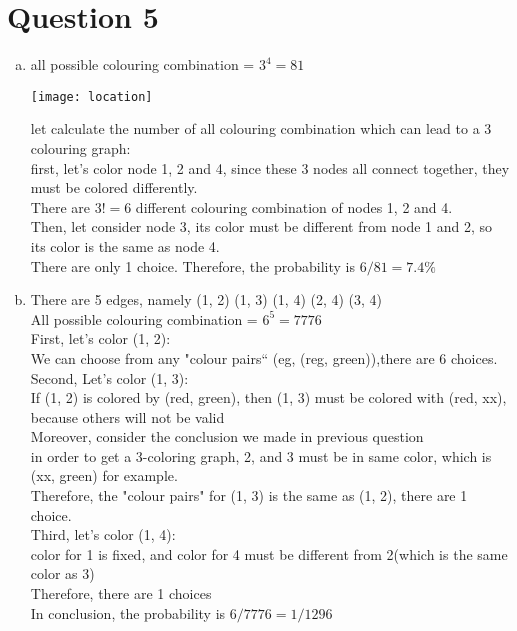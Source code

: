 \documentclass[11pt, a4paper]{article}
\begin{document}
\section*{Question 5}
\begin{enumerate}[(a)]
    \item
    all possible colouring combination = $ 3^4 = 81 $\\
        \begin{center}
            \texttt{[image: location]}
        \end{center}
    let calculate the number of all colouring combination which can lead to a 3 colouring graph:\\
    first, let's color node 1, 2 and 4, since these 3 nodes all connect together, they must be colored differently.\\
    There are $ 3! = 6 $ different colouring combination of nodes 1, 2 and 4.\\
    Then, let consider node 3, its color must be different from node 1 and 2, so its color is the same as node 4.\\
    There are only 1 choice.
    Therefore, the probability is $ 6/81 = 7.4\% $
    \item
    There are 5 edges, namely (1, 2) (1, 3) (1, 4) (2, 4) (3, 4)\\
    All possible colouring combination = $ 6^5 = 7776 $\\
    First, let's color (1, 2):\\
    We can choose from any "colour pairs“ (eg, (reg, green)),there are 6 choices.\\
    Second, Let's color (1, 3):\\
    If (1, 2) is colored by (red, green), then (1, 3) must be colored with (red, xx), because others will not be valid\\
    Moreover, consider the conclusion we made in previous question\\
    in order to get a 3-coloring graph, 2, and 3 must be in same color, which is (xx, green) for example.\\
    Therefore, the "colour pairs" for (1, 3) is the same as (1, 2), there are 1 choice.\\
    Third, let's color (1, 4):\\
    color for 1 is fixed, and color for 4 must be different from 2(which is the same color as 3)\\
    Therefore, there are 1 choices\\
    In conclusion, the probability is $ 6/7776 = 1/1296 $
\end{enumerate}
\end{document}
